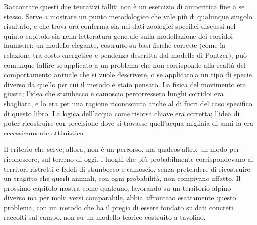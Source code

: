 Raccontare questi due tentativi falliti non è un esercizio di autocritica fine a se stesso. Serve a mostrare un punto metodologico che vale più di qualunque singolo risultato, e che trova ora conferma sia nei dati zoologici specifici discussi nel quinto capitolo sia nella letteratura generale sulla modellazione dei corridoi faunistici: un modello elegante, costruito su basi fisiche corrette (come la relazione tra costo energetico e pendenza descritta dal modello di Pontzer), può comunque fallire se applicato a un problema che non corrisponde alla realtà del comportamento animale che si vuole descrivere, o se applicato a un tipo di specie diverso da quello per cui il metodo è stato pensato. La fisica del movimento era giusta; l'idea che stambecco e camoscio percorressero lunghi corridoi era sbagliata, e lo era per una ragione riconosciuta anche al di fuori del caso specifico di questo libro. La logica dell'acqua come risorsa chiave era corretta; l'idea di poter ricostruire con precisione dove si trovasse quell'acqua migliaia di anni fa era eccessivamente ottimistica.

Il criterio che serve, allora, non è un percorso, ma qualcos'altro: un modo per riconoscere, sul terreno di oggi, i luoghi che più probabilmente corrispondevano ai territori ristretti e fedeli di stambecco e camoscio, senza pretendere di ricostruire un tragitto che quegli animali, con ogni probabilità, non compivano affatto. Il prossimo capitolo mostra come qualcuno, lavorando su un territorio alpino diverso ma per molti versi comparabile, abbia affrontato esattamente questo problema, con un metodo che ha il pregio di essere fondato su dati concreti raccolti sul campo, non su un modello teorico costruito a tavolino.
